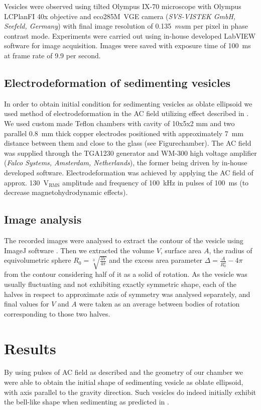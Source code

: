 \documentclass[10pt,a4paper,draft]{article}
\begin{document}
Vesicles were observed using tilted Olympus IX-70 microscope with Olympus LCPlanFI 40x objective and eco285M~VGE camera \newline (\emph{SVS-VISTEK GmbH, Seefeld, Germany}) with final image resolution of 0.135~$mu$m per pixel in phase contrast mode. Experiments were carried out using in-house developed LabVIEW software for image acquisition. Images were saved with exposure time of 100~ms at frame rate of 9.9 per second.

\subsection{Electrodeformation of sedimenting vesicles}

In order to obtain initial condition for sedimenting vesicles as oblate ellipsoid we used method of electrodeformation in the AC field utilizing effect described in \cite{Aranda2008}.
We used custom made Teflon chambers with cavity of 10x5x2 mm and two parallel 0.8~mm thick copper electrodes positioned with approximately 7~mm distance between them and close to the glass (see Figure{chamber}). The AC field was supplied through the TGA1230 generator and WM-300 high voltage amplifier (\emph{Falco Systems, Amsterdam, Netherlands}), the former being driven by in-house developed software.
Electrodeformation was achieved by applying the AC field of approx. 130~V$_\mathrm{RMS}$ amplitude and frequency of 100~kHz in pulses of 100~ms (to decrease magnetohydrodynamic effects).

\subsection{Image analysis}
The recorded images were analysed to extract the contour of the vesicle using ImageJ software \cite{ImageJ}. Then we extracted the volume $V$, surface area $A$, the radius of equivolumetric sphere $R_0 = \sqrt[3]{\frac{3V}{4\pi}}$ and the excess area parameter $\Delta = \frac{A}{R_0^2} - 4\pi$ from the contour considering half of it as a solid of rotation. As the vesicle was usually fluctuating and not exhibiting exactly symmetric shape, each of the halves in respect to approximate axis of symmetry was analysed separately, and final values for $V$ and $A$ were taken as an average between bodies of rotation corresponding to those two halves.

\section{Results}\label{results}
By using pulses of AC field as described and the geometry of our chamber we were able to obtain the initial shape of sedimenting vesicle as oblate ellipsoid, with axis parallel to the gravity direction.
Such vesicles do indeed initially exhibit the bell-like shape when sedimenting as predicted in \cite{Boedec2012}.
\end{document}

